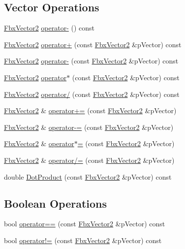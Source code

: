 \subsection*{Vector Operations}
\begin{DoxyCompactItemize}
\item 
\hyperlink{class_fbx_vector2}{Fbx\+Vector2} \hyperlink{class_fbx_vector2_a4a135af7caa6377da57df7cd4cd1e06b}{operator-\/} () const
\item 
\hyperlink{class_fbx_vector2}{Fbx\+Vector2} \hyperlink{class_fbx_vector2_abe1301a610590c2eec654449b2420392}{operator+} (const \hyperlink{class_fbx_vector2}{Fbx\+Vector2} \&p\+Vector) const
\item 
\hyperlink{class_fbx_vector2}{Fbx\+Vector2} \hyperlink{class_fbx_vector2_ac0034032780f2e53ac9775bb8302b45d}{operator-\/} (const \hyperlink{class_fbx_vector2}{Fbx\+Vector2} \&p\+Vector) const
\item 
\hyperlink{class_fbx_vector2}{Fbx\+Vector2} \hyperlink{class_fbx_vector2_a23e549f48d5149cab64d2704bc559662}{operator$\ast$} (const \hyperlink{class_fbx_vector2}{Fbx\+Vector2} \&p\+Vector) const
\item 
\hyperlink{class_fbx_vector2}{Fbx\+Vector2} \hyperlink{class_fbx_vector2_a8a5b9035fefe1229eedeb323c1473320}{operator/} (const \hyperlink{class_fbx_vector2}{Fbx\+Vector2} \&p\+Vector) const
\item 
\hyperlink{class_fbx_vector2}{Fbx\+Vector2} \& \hyperlink{class_fbx_vector2_abd3355ddb4401ca0a774c6b46726fb44}{operator+=} (const \hyperlink{class_fbx_vector2}{Fbx\+Vector2} \&p\+Vector)
\item 
\hyperlink{class_fbx_vector2}{Fbx\+Vector2} \& \hyperlink{class_fbx_vector2_a7a84b5172b0bbe90d4eaea8e06b0d7fe}{operator-\/=} (const \hyperlink{class_fbx_vector2}{Fbx\+Vector2} \&p\+Vector)
\item 
\hyperlink{class_fbx_vector2}{Fbx\+Vector2} \& \hyperlink{class_fbx_vector2_aeef4474f48ac7dc57d0e159d0850f0c4}{operator$\ast$=} (const \hyperlink{class_fbx_vector2}{Fbx\+Vector2} \&p\+Vector)
\item 
\hyperlink{class_fbx_vector2}{Fbx\+Vector2} \& \hyperlink{class_fbx_vector2_ab5cb65076098583d38293fd01311decb}{operator/=} (const \hyperlink{class_fbx_vector2}{Fbx\+Vector2} \&p\+Vector)
\item 
double \hyperlink{class_fbx_vector2_a78b87568a55f7cf9f38694367e640fae}{Dot\+Product} (const \hyperlink{class_fbx_vector2}{Fbx\+Vector2} \&p\+Vector) const
\end{DoxyCompactItemize}
\subsection*{Boolean Operations}
\begin{DoxyCompactItemize}
\item 
bool \hyperlink{class_fbx_vector2_a4196aa8199019d572c3b01c1521778d5}{operator==} (const \hyperlink{class_fbx_vector2}{Fbx\+Vector2} \&p\+Vector) const
\item 
bool \hyperlink{class_fbx_vector2_a9047e886e7588b3f46faf8949346833f}{operator!=} (const \hyperlink{class_fbx_vector2}{Fbx\+Vector2} \&p\+Vector) const
\end{DoxyCompactItemize}
